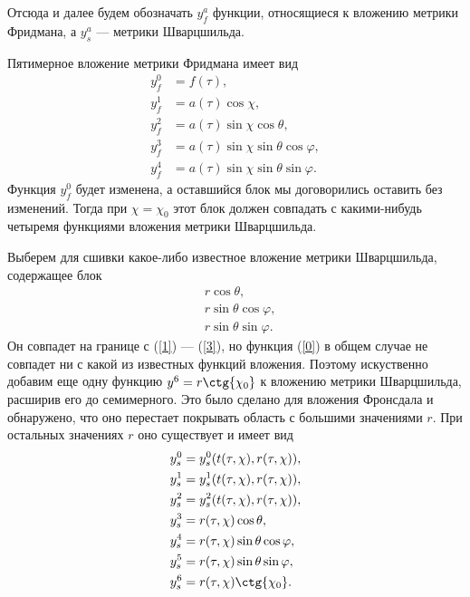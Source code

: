 \documentclass[12pt]{article}
\begin{document}
Отсюда и далее будем обозначать $y^a_f$ функции, относящиеся к вложению метрики Фридмана, а $y^a_s$ --- метрики Шварцшильда.

Пятимерное вложение метрики Фридмана имеет вид
\begin{align}
	y^0_f &= f(\tau), \\
\label{0}	y^1_f &= a(\tau) \cos{\chi}, \\
\label{1}	y^2_f &= a(\tau) \sin{\chi} \cos{\theta}, \\
\label{2}	y^3_f &= a(\tau) \sin{\chi} \sin{\theta} \cos{\varphi}, \\
\label{3}	y^4_f &= a(\tau) \sin{\chi} \sin{\theta} \sin{\varphi}.
\end{align}
Функция $y^0_f$ будет изменена, а оставшийся блок мы договорились оставить без изменений. Тогда при $\chi = \chi_0$ этот блок должен совпадать с какими-нибудь четыремя функциями вложения метрики Шварцшильда. 

Выберем для сшивки какое-либо известное вложение метрики Шварцшильда, содержащее блок
\begin{align}
	&r \cos{\theta}, \\
	&r \sin{\theta} \cos{\varphi}, \\
	&r \sin{\theta} \sin{\varphi}.
\end{align}
Он совпадет на границе с (\ref{1}) --- (\ref{3}), но функция (\ref{0}) в общем случае не совпадет ни с какой из известных функций вложения. Поэтому искуственно добавим еще одну функцию $y^6 = r \ctg{\chi_0}$ к вложению метрики Шварцшильда, расширив его до семимерного. Это было сделано для вложения Фронсдала и обнаружено, что оно перестает покрывать область с большими значениями $r$. При остальных значениях $r$ оно существует и имеет вид
\begin{align}
\label{4}	&y^0_s = y^0_s(t(\tau, \chi), r(\tau, \chi)), \\
\label{5}	&y^1_s = y^1_s(t(\tau, \chi), r(\tau, \chi)), \\
\label{6}	&y^2_s = y^2_s(t(\tau, \chi), r(\tau, \chi)), \\
	&y^3_s = r(\tau, \chi) \cos{\theta}, \\
	&y^4_s = r(\tau, \chi) \sin{\theta} \cos{\varphi}, \\
	&y^5_s = r(\tau, \chi) \sin{\theta} \sin{\varphi}, \\
\label{7}	&y^6_s = r(\tau, \chi) \ctg{\chi_0}.
\end{align}
\end{document}
